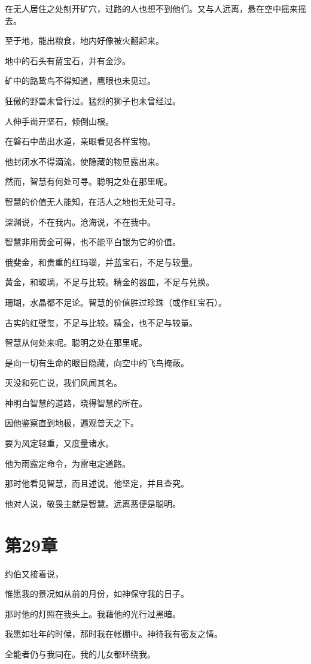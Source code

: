\documentclass[12pt,oneside]{book}
\begin{document}
在无人居住之处刨开矿穴，过路的人也想不到他们。又与人远离，悬在空中摇来摇去。

至于地，能出粮食，地内好像被火翻起来。

地中的石头有蓝宝石，并有金沙。

矿中的路鸷鸟不得知道，鹰眼也未见过。

狂傲的野兽未曾行过。猛烈的狮子也未曾经过。

人伸手凿开坚石，倾倒山根。

在磐石中凿出水道，亲眼看见各样宝物。

他封闭水不得滴流，使隐藏的物显露出来。

然而，智慧有何处可寻。聪明之处在那里呢。

智慧的价值无人能知，在活人之地也无处可寻。

深渊说，不在我内。沧海说，不在我中。

智慧非用黄金可得，也不能平白银为它的价值。

俄斐金，和贵重的红玛瑙，并蓝宝石，不足与较量。

黄金，和玻璃，不足与比较。精金的器皿，不足与兑换。

珊瑚，水晶都不足论。智慧的价值胜过珍珠（或作红宝石）。

古实的红璧玺，不足与比较。精金，也不足与较量。

智慧从何处来呢。聪明之处在那里呢。

是向一切有生命的眼目隐藏，向空中的飞鸟掩蔽。

灭没和死亡说，我们风闻其名。

神明白智慧的道路，晓得智慧的所在。

因他鉴察直到地极，遍观普天之下。

要为风定轻重，又度量诸水。

他为雨露定命令，为雷电定道路。

那时他看见智慧，而且述说。他坚定，并且查究。

他对人说，敬畏主就是智慧。远离恶便是聪明。


\chapter{第29章}
约伯又接着说，

惟愿我的景况如从前的月份，如神保守我的日子。

那时他的灯照在我头上。我藉他的光行过黑暗。

我愿如壮年的时候，那时我在帐棚中。神待我有密友之情。

全能者仍与我同在。我的儿女都环绕我。
\end{document}
